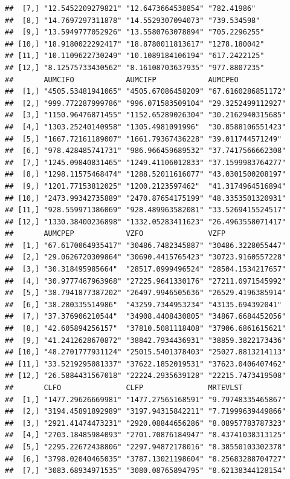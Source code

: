 \documentclass[12pt,]{krantz}
\theoremstyle{definition}
\theoremstyle{definition}
\theoremstyle{definition}
\theoremstyle{remark}
\begin{document}
\begin{verbatim}
##  [7,] "12.5452209279821" "12.6473664538854" "782.41986"   
##  [8,] "14.7697297311878" "14.5529307094073" "739.534598"  
##  [9,] "13.5949777052926" "13.5580763078894" "705.2296255" 
## [10,] "18.9180022292417" "18.8780011813617" "1278.180042" 
## [11,] "10.1109622730249" "10.1089184106194" "617.2422125" 
## [12,] "8.12575733430562" "8.16108703637935" "977.8807235" 
##       AUMCIFO            AUMCIFP            AUMCPEO           
##  [1,] "4505.53481941065" "4505.67086458209" "67.6160286851172"
##  [2,] "999.772287999786" "996.071583509104" "29.3252499112927"
##  [3,] "1150.96476871455" "1152.65289026304" "30.2162940315685"
##  [4,] "1303.25240140958" "1305.4981091996"  "30.8588106551423"
##  [5,] "1667.72161189007" "1661.79367436228" "39.011744571249" 
##  [6,] "978.428485741731" "986.966459689532" "37.7417566662308"
##  [7,] "1245.09840831465" "1249.41106012833" "37.1599983764277"
##  [8,] "1298.11575468474" "1288.52011616077" "43.0301500208197"
##  [9,] "1201.77153812025" "1200.2123597462"  "41.3174964516894"
## [10,] "2473.99342735889" "2470.87654175199" "48.3353501320931"
## [11,] "928.559971386069" "928.489963582081" "33.5269415524517"
## [12,] "1330.38400236898" "1332.05283411623" "26.4963558071417"
##       AUMCPEP            VZFO               VZFP              
##  [1,] "67.6170064935417" "30486.7482345887" "30486.3228055447"
##  [2,] "29.0626720309864" "30690.4415765423" "30723.9160557228"
##  [3,] "30.318495985664"  "28517.0999496524" "28504.1534217657"
##  [4,] "30.9777467963968" "27225.9641330176" "27211.0971545992"
##  [5,] "38.7941877387202" "26497.9946505636" "26529.4196385914"
##  [6,] "38.280335514986"  "43259.7344953234" "43135.694392041" 
##  [7,] "37.376906210544"  "34908.4408430805" "34867.6684452056"
##  [8,] "42.605894256157"  "37810.5081118408" "37906.6861615621"
##  [9,] "41.2412628670872" "38842.7934436931" "38859.3822173436"
## [10,] "48.2701777931124" "25015.5401378403" "25027.8813214113"
## [11,] "33.5219295081337" "37622.1852019531" "37623.0406407462"
## [12,] "26.5884431567018" "22224.2935639128" "22215.7473419508"
##       CLFO               CLFP               MRTEVLST          
##  [1,] "1477.29626669981" "1477.27565168591" "9.79748335465867"
##  [2,] "3194.45891892989" "3197.94315842211" "7.71999639449866"
##  [3,] "2921.41474473231" "2920.08844656286" "8.08957783787323"
##  [4,] "2703.18485984093" "2701.70876184947" "8.43741038313125"
##  [5,] "2295.22672438806" "2297.94872178016" "8.38550103302378"
##  [6,] "3798.02040465035" "3787.13021198604" "8.25683288704727"
##  [7,] "3083.68934971535" "3080.08765894795" "8.62138344128154"

\end{verbatim}
\end{document}
